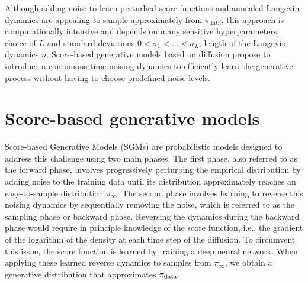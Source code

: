 \documentclass[english,graybox,envcountchap,envcountsame,sectrefs,shortlabels]{svmono}
\theoremstyle{style}
\begin{document}
Although adding noise to learn perturbed score functions and annealed Langevin dynamics are appealing to sample approximately from $\pi_{\mathrm{data}}$, this approach is computationally intensive and depends on many sensitive hyperparameters: choice of $L$ and standard deviations $0<\sigma_1 < \ldots <\sigma_L$, length of the Langevin dynamics $n$.  Score-based generative models based on diffusion propose to introduce a continuous-time noising dynamics to efficiently learn the generative process without having to choose predefined noise levels.

\section{Score-based generative models}

Score-based Generative Models (SGMs) are probabilistic models designed to address this challenge using two main phases. The first phase, also referred to as the forward phase, involves progressively perturbing the empirical distribution by adding noise to the training data until its distribution approximately reaches an {easy-to-sample} distribution $\pi_{\infty}$. The second phase involves learning to reverse this noising dynamics by sequentially removing the noise, which is referred to as the sampling phase or backward phase. 
Reversing the dynamics during the backward phase would require in principle knowledge of the score function, i.e., the gradient of the logarithm of the density at each time step of the diffusion. 
To circumvent this issue, the score function is learned by training  a deep neural network. When applying these learned reverse dynamics to samples from  $\pi_\infty$, we obtain a generative distribution that approximates  $\pi_{\rm data}$. 


\newcommand{\sched}{\beta}
\newcommand{\ola}{\overleftarrow}
\newcommand{\ora}{\overrightarrow}
\newcommand{\gausspdf}{\varphi}
\newcommand{\param}{\theta}
\newcommand{\pihat}{\widehat{\pi}_N^{(\beta,\theta)}}
\end{document}
